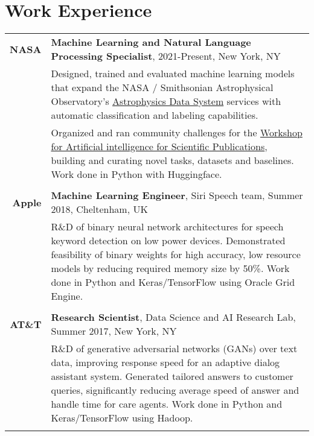 \documentclass[a4paper,10pt]{article}
\begin{document}
\section{Work Experience}
    \vspace{0.2cm}
    \begin{tabular}{r|p{160mm}}
        \textbf{NASA} &  \textbf{Machine Learning and Natural Language Processing Specialist}, 2021-Present, New York, NY\\ 
        & \small{Designed, trained and evaluated machine learning models that expand the NASA / Smithsonian Astrophysical Observatory's \href{https://scixplorer.org/}{Astrophysics Data System} services with automatic classification and labeling capabilities.}\\
        & \small{Organized and ran community challenges for the \href{https://ui.adsabs.harvard.edu/WIESP/}{Workshop for Artificial intelligence for Scientific Publications}, building and curating novel tasks, datasets and baselines. Work done in Python with Huggingface.}\\
        \multicolumn{2}{c}{} \vspace{-1.5mm} \\

        \textbf{Apple} & \textbf{Machine Learning Engineer}, Siri Speech team, Summer 2018, Cheltenham, UK\\
        & \small{R\&D of binary neural network architectures for speech keyword detection on low power devices. Demonstrated feasibility of binary weights for high accuracy, low resource models by reducing required memory size by 50\%. Work done in Python and Keras/TensorFlow using Oracle Grid Engine.}\\
        \multicolumn{2}{c}{} \vspace{-1.5mm} \\

        \textbf{AT\&T} & \textbf{Research Scientist}, Data Science and AI Research Lab, Summer 2017, New York, NY\\
        & \small{R\&D of generative adversarial networks (GANs) over text data, improving response speed for an adaptive dialog assistant system. Generated tailored answers to customer queries, significantly reducing average speed of answer and handle time for care agents. Work done in Python and Keras/TensorFlow using Hadoop.}\\
        \multicolumn{2}{c}{} \vspace{-1.5mm} \\
        

\end{tabular}
\end{document}
